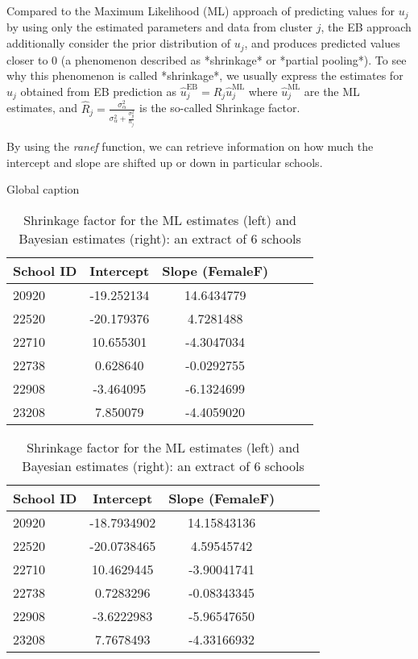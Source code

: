 Compared to the Maximum Likelihood (ML) approach of predicting values for $u_j$ by using only the estimated parameters and data from cluster $j$, the EB approach additionally consider the prior distribution of $u_{j}$, and produces predicted values closer to $0$ (a phenomenon described as *shrinkage* or *partial pooling*).  To see why this phenomenon is called *shrinkage*, we usually express the estimates for $u_j$ obtained from EB prediction as $\hat{u}_j^{\text{EB}} = \hat{R}_j\hat{u}_j^{\text{ML}}$ where $\hat{u}_j^{\text{ML}}$ are the ML estimates, and $\hat{R}_j = \frac{\sigma_\alpha^2}{\sigma_\alpha^2 + \frac{\sigma_y^2}{n_j}}$ is the so-called Shrinkage factor.

By using the \textit{ranef} function, we can retrieve information on how much the intercept and slope are shifted up or down in particular schools.

\begin{table}[!htb]
	\caption{Global caption}
	
	\begin{minipage}{.5\linewidth}
		\caption{}
		\centering
		{
			\begin{tabular}{l | c c c c c}
				School ID & Intercept & Slope (FemaleF)\\
				\hline
				20920 & -19.252134 & 14.6434779 \\
				22520 & -20.179376 & 4.7281488 \\
				22710 & 10.655301 & -4.3047034 \\
				22738  & 0.628640 & -0.0292755 \\
				22908 & -3.464095 & -6.1324699 \\
				23208 & 7.850079 & -4.4059020
			\end{tabular}
		}
	\end{minipage}%
	\begin{minipage}{.5\linewidth}
		\centering
		\caption{}
		{
			\begin{tabular}{l | c c c c c}
				School ID & Intercept & Slope (FemaleF)\\
				\hline
				20920 & -18.7934902 & 14.15843136 \\
				22520 & -20.0738465  & 4.59545742 \\
				22710  & 10.4629445 & -3.90041741 \\
				22738  & 0.7283296 & -0.08343345  \\
				22908 & -3.6222983 & -5.96547650 \\
				23208  & 7.7678493 & -4.33166932
			\end{tabular}
		}
		
	\end{minipage}
	\caption{{\small Shrinkage factor for the ML estimates (left) and Bayesian estimates (right): an extract of 6 schools}}
	\label{tab:shrinkage}
\end{table}

